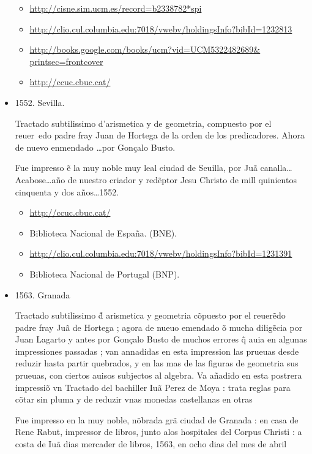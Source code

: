 \documentclass{amsart}
\begin{document}
\begin{itemize}
\begin{itemize}
\item
\url{http://cisne.sim.ucm.es/record=b2338782*spi}
\item
\url{http://clio.cul.columbia.edu:7018/vwebv/holdingsInfo?bibId=1232813}
\item
\url{http://books.google.com/books/ucm?vid=UCM5322482689& printsec=frontcover} 
\item
\url{http://ccuc.cbuc.cat/}
\end{itemize}

\item 1552. Sevilla.

Tractado subtilissimo d'arismetica y de geometria, compuesto por  el reuer~edo padre fray Juan de Hortega de la orden de los predicadores.
Ahora de nuevo enmendado \ldots por Gon\c{c}alo Busto.

    Fue impresso \~e la muy noble  muy leal ciudad de Seuilla, por Ju\~a canalla\ldots
     Acabose\ldots a\~no de nuestro criador y red\~eptor Jesu Christo de mill  quinientos  cinquenta y dos a\~nos\ldots 1552.

\begin{itemize}
\item
\url{http://ccuc.cbuc.cat/}
\item  Biblioteca Nacional de Espa\~na. (BNE).
\item
 \url{http://clio.cul.columbia.edu:7018/vwebv/holdingsInfo?bibId=1231391}
\item
 Biblioteca Nacional de Portugal (BNP). 
\end{itemize}
\item 1563. Granada

Tractado subtilissimo \~d arismetica y geometria  c\~opuesto por el reuer\~edo padre fray Ju\~a de Hortega ; agora de nueuo emendado \~o mucha dilig\~ecia por Juan Lagarto y antes por Gon\c{c}alo Busto de muchos errores \~q auia en algunas impressiones passadas ; van annadidas en esta impression las prueuas desde reduzir hasta partir quebrados, y en las mas de las figuras de geometria sus prueuas, con ciertos auisos subjectos al algebra. Va a\~nadido en esta postrera impressi\~o vn Tractado del bachiller Iu\~a Perez de Moya : trata reglas para c\~otar sin pluma y de reduzir vnas monedas castellanas en otras

Fue impresso en la muy noble, n\~obrada  gr\~a ciudad de Granada : en casa de Rene Rabut, impressor de libros, junto alos hospitales del Corpus Christi : a costa de Iu\~a dias mercader de libros, 1563, en ocho dias del mes de abril


\end{itemize}
\end{document}
